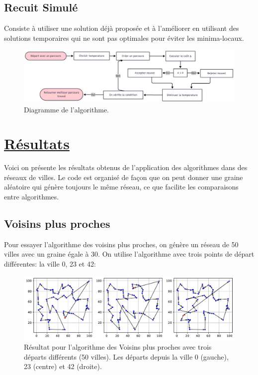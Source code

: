 \documentclass[a4paper,11pt,fleqn]{article}
\begin{document}
\subsection*{Recuit Simulé}
Consiste à utiliser une solution déjà proposée et à l’améliorer en utilisant des solutions temporaires qui ne sont pas optimales pour éviter les minima-locaux. 

\begin{figure}[H]
    \centering
    \includegraphics[width=\textwidth]{images/charte-recuit.png}
    \caption{Diagramme de l'algorithme.}
    \label{fig:charte-recuit}
\end{figure}

\section*{\underline{Résultats}}
Voici on présente les résultats obtenus de l'application des algorithmes dans des réseaux de villes. Le code est organisé de façon que on peut donner une graine aléatoire qui génère toujours le même réseau, ce que facilite les comparaisons entre algorithmes.

\subsection*{Voisins plus proches}
Pour essayer l'algorithme des voisins plus proches, on génère un réseau de 50 villes avec un graine égale à 30. On utilise l'algorithme avec trois points de départ différentes: la ville 0, 23 et 42:
\begin{figure}[H]
    \centering
    \includegraphics[width=\textwidth]{images/NN_50_villes_3departs.pdf}
    \caption{Résultat pour l'algorithme des Voisins plus proches avec trois départs différents (50 villes). Les départs depuis la ville 0 (gauche), 23 (centre) et 42 (droite).}
    \label{fig:nn-50}
\end{figure}
\end{document}
